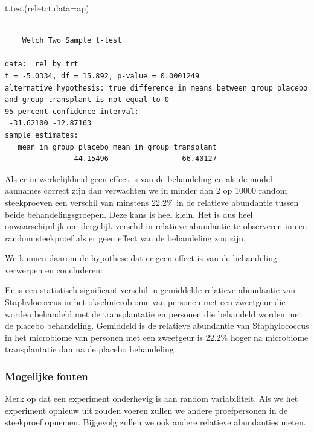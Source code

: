 \documentclass[
  dutch,
  letterpaper,
  12pt]{book}
\newenvironment{Shaded}{\begin{snugshade}}{\end{snugshade}}
\newcommand{\AttributeTok}[1]{\textcolor[rgb]{0.40,0.45,0.13}{#1}}
\newcommand{\FunctionTok}[1]{\textcolor[rgb]{0.28,0.35,0.67}{#1}}
\newcommand{\NormalTok}[1]{\textcolor[rgb]{0.00,0.23,0.31}{#1}}
\newcommand{\SpecialCharTok}[1]{\textcolor[rgb]{0.37,0.37,0.37}{#1}}
\theoremstyle{definition}
\theoremstyle{definition}
\theoremstyle{definition}
\theoremstyle{remark}
\begin{document}
\begin{Shaded}
\begin{Highlighting}[]
\FunctionTok{t.test}\NormalTok{(rel}\SpecialCharTok{\textasciitilde{}}\NormalTok{trt,}\AttributeTok{data=}\NormalTok{ap)}
\end{Highlighting}
\end{Shaded}

\begin{verbatim}

    Welch Two Sample t-test

data:  rel by trt
t = -5.0334, df = 15.892, p-value = 0.0001249
alternative hypothesis: true difference in means between group placebo and group transplant is not equal to 0
95 percent confidence interval:
 -31.62100 -12.87163
sample estimates:
   mean in group placebo mean in group transplant 
                44.15496                 66.40127 
\end{verbatim}

Als er in werkelijkheid geen effect is van de behandeling en als de
model aannames correct zijn dan verwachten we in minder dan 2 op 10000
random steekproeven een verschil van minstens 22.2\% in de relatieve
abundantie tussen beide behandelingsgroepen. Deze kans is heel klein.
Het is dus heel onwaarschijnlijk om dergelijk verschil in relatieve
abundantie te observeren in een random steekproef als er geen effect van
de behandeling zou zijn.

We kunnen daarom de hypothese dat er geen effect is van de behandeling
verwerpen en concluderen:

Er is een statistisch significant verschil in gemiddelde relatieve
abundantie van Staphylococcus in het okselmicrobiome van personen met
een zweetgeur die worden behandeld met de transplantatie en personen die
behandeld worden met de placebo behandeling. Gemiddeld is de relatieve
abundantie van Staphylococcus in het microbiome van personen met een
zweetgeur is 22.2\% hoger na microbiome transplantatie dan na de placebo
behandeling.

\subsubsection{Mogelijke fouten}\label{mogelijke-fouten}

Merk op dat een experiment onderhevig is aan random variabiliteit. Als
we het experiment opnieuw uit zouden voeren zullen we andere
proefpersonen in de steekproef opnemen. Bijgevolg zullen we ook andere
relatieve abundanties meten.
\end{document}
